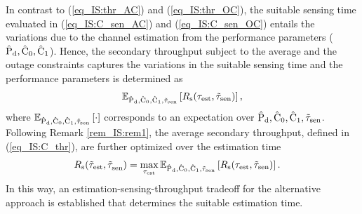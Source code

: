 \begin{coro} \label{cor_IS:cor1}
\normalfont
{} 
In contrast to (\ref{eq_IS:thr_AC}) and (\ref{eq_IS:thr_OC}), the suitable sensing time evaluated in (\ref{eq_IS:C_sen_AC}) and (\ref{eq_IS:C_sen_OC}) entails the variations due to the channel estimation from the performance parameters ($\epd, \ecz, \eco$). Hence, the secondary throughput subject to the average and the outage constraints captures the variations in the suitable sensing time and the performance parameters is determined as 
\begin{align}
\e{\epd, \ecz, \eco, \ttsen}{\rs(\test, \ttsen)} \label{eq_IS:C_thr},
\end{align}
where $\e{\epd, \ecz, \eco, \ttsen}{\cdot}$ corresponds to an expectation over $\epd, \ecz, \eco, \ttsen$.
Following Remark \ref{rem_IS:rem1}, the average secondary throughput, defined in (\ref{eq_IS:C_thr}), are further optimized over the estimation time 
\begin{align}
\trs(\ttest, \ttsenac) &= \maxi_{\test} \e{\epd, \ecz, \eco, \ttsen}{\rs(\test, \ttsen)} \label{eq_IS:C_thr_AC}. 
\end{align}
In this way, an estimation-sensing-throughput tradeoff for the alternative approach is established that determines the suitable estimation time.    
\end{coro}
